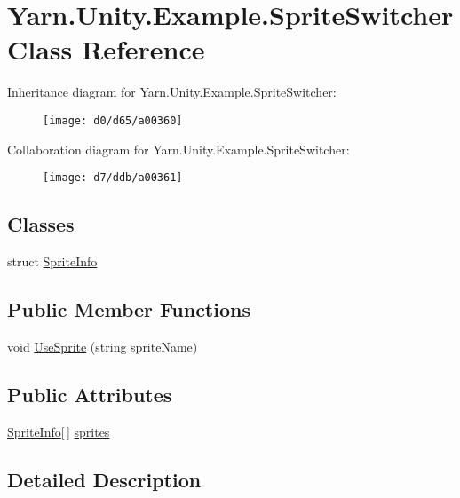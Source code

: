 \hypertarget{a00073}{\section{Yarn.\-Unity.\-Example.\-Sprite\-Switcher Class Reference}
\label{a00073}
}


Inheritance diagram for Yarn.\-Unity.\-Example.\-Sprite\-Switcher\-:
\nopagebreak
\begin{figure}[H]
\begin{center}
\leavevmode
\texttt{[image: d0/d65/a00360]}
\end{center}
\end{figure}


Collaboration diagram for Yarn.\-Unity.\-Example.\-Sprite\-Switcher\-:
\nopagebreak
\begin{figure}[H]
\begin{center}
\leavevmode
\texttt{[image: d7/ddb/a00361]}
\end{center}
\end{figure}
\subsection*{Classes}
\begin{DoxyCompactItemize}
\item 
struct \hyperlink{a00073_dd/dae/a00163}{Sprite\-Info}
\end{DoxyCompactItemize}
\subsection*{Public Member Functions}
\begin{DoxyCompactItemize}
\item 
void \hyperlink{a00073_ac26718b713f342f3de8f3e569c5b62da}{Use\-Sprite} (string sprite\-Name)
\end{DoxyCompactItemize}
\subsection*{Public Attributes}
\begin{DoxyCompactItemize}
\item 
\hyperlink{a00073_dd/dae/a00163}{Sprite\-Info}\mbox{[}$\,$\mbox{]} \hyperlink{a00073_a1e85d9f4f6b33ca7ae638cce2eb704aa}{sprites}
\end{DoxyCompactItemize}


\subsection{Detailed Description}


